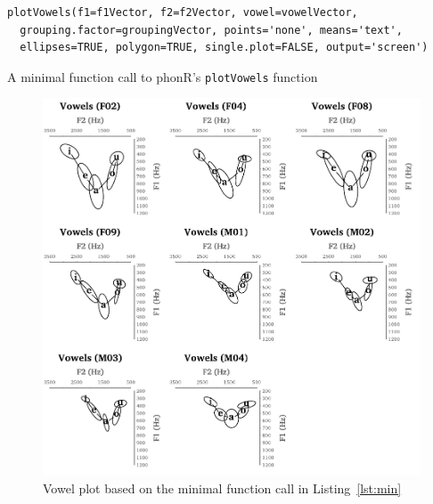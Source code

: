 \documentclass[12pt,oneside]{article}
\begin{document}
\begin{listing}[H]
\begin{verbatim}
plotVowels(f1=f1Vector, f2=f2Vector, vowel=vowelVector, 
  grouping.factor=groupingVector, points='none', means='text', 
  ellipses=TRUE, polygon=TRUE, single.plot=FALSE, output='screen')
\end{verbatim}
\caption{A minimal function call to phonR's \texttt{plotVowels} function}
\label{lst:min}
\end{listing}

\begin{figure}[H]
	\begin{center}
		\includegraphics[width=\textwidth]{indoLattice.pdf}
		\caption{Vowel plot based on the minimal function call in Listing~\ref{lst:min}}
		\label{fig:indoLattice}
	\end{center}
\end{figure}
\end{document}
